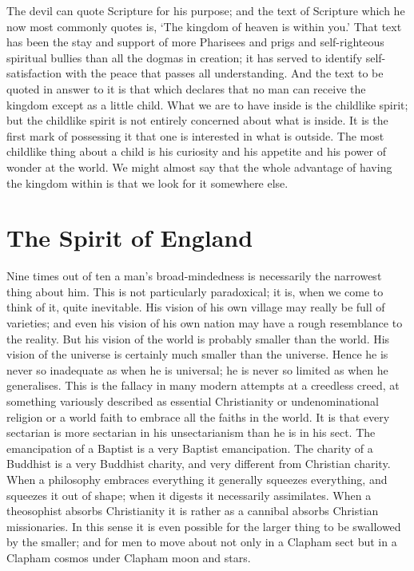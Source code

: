 \documentclass{book}
\begin{document}
The devil can quote Scripture for his purpose; and the text of Scripture which he now most commonly quotes is, ‘The kingdom of heaven is within you.’ That text has been the stay and support of more Pharisees and prigs and self-righteous spiritual bullies than all the dogmas in creation; it has served to identify self-satisfaction with the peace that passes all understanding. And the text to be quoted in answer to it is that which declares that no man can receive the kingdom except as a little child. What we are to have inside is the childlike spirit; but the childlike spirit is not entirely concerned about what is inside. It is the first mark of possessing it that one is interested in what is outside. The most childlike thing about a child is his curiosity and his appetite and his power of wonder at the world. We might almost say that the whole advantage of having the kingdom within is that we look for it somewhere else.

\chapter{The Spirit of England}
\label{chapter-17}
Nine times out of ten a man’s broad-mindedness is necessarily the narrowest thing about him. This is not particularly paradoxical; it is, when we come to think of it, quite inevitable. His vision of his own village may really be full of varieties; and even his vision of his own nation may have a rough resemblance to the reality. But his vision of the world is probably smaller than the world. His vision of the universe is certainly much smaller than the universe. Hence he is never so inadequate as when he is universal; he is never so limited as when he generalises. This is the fallacy in many modern attempts at a creedless creed, at something variously described as essential Christianity or undenominational religion or a world faith to embrace all the faiths in the world. It is that every sectarian is more sectarian in his unsectarianism than he is in his sect. The emancipation of a Baptist is a very Baptist emancipation. The charity of a Buddhist is a very Buddhist charity, and very different from Christian charity. When a philosophy embraces everything it generally squeezes everything, and squeezes it out of shape; when it digests it necessarily assimilates. When a theosophist absorbs Christianity it is rather as a cannibal absorbs Christian missionaries. In this sense it is even possible for the larger thing to be swallowed by the smaller; and for men to move about not only in a Clapham sect but in a Clapham cosmos under Clapham moon and stars.
\end{document}
